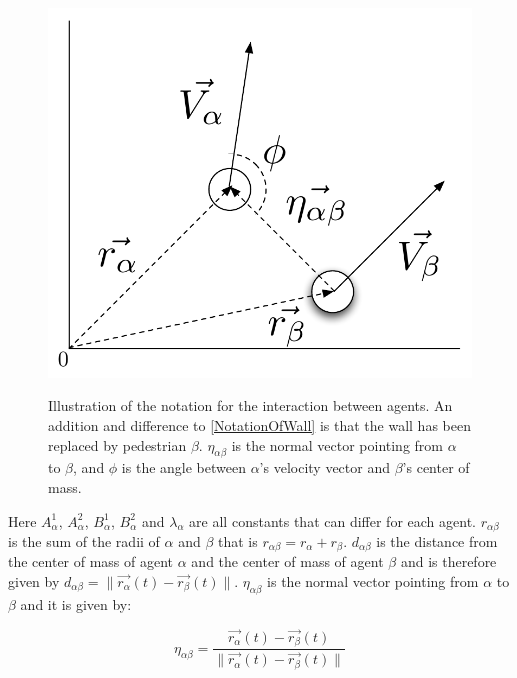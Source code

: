 \begin{figure}[ht]
    \centering
    {\includegraphics[scale=0.35]{Figures/NotationOfInteraction.pdf}} 
    \caption[Notation of the interaction between two agents]{Illustration of the notation for the interaction between agents.
	     An addition and difference to \ref{NotationOfWall} is that the wall has been replaced by pedestrian $\beta$.
	     $\eta_{\alpha \beta}$ is the normal vector pointing from $\alpha$ to $\beta$, and $\phi$ is the angle between $\alpha$'s 
	     velocity vector and $\beta$'s center of mass.}
    \label{NotationOfInteraction}
\end{figure}

Here $A_{\alpha}^{1}$, $A_{\alpha}^{2}$, $B_{\alpha}^{1}$, $B_{\alpha}^{2}$ 
and $\lambda_{\alpha}$ are all constants that can differ for each agent. 
$r_{\alpha \beta}$ is the sum of the radii of $\alpha$ and $\beta$ that is 
$r_{\alpha \beta} = r_{\alpha} + r_{\beta}$. $d_{\alpha \beta}$ is the 
distance from the center of mass of agent $\alpha$ and the center of mass of 
agent $\beta$ and is therefore given by $d_{\alpha \beta} = 
\|\vec{r_{\alpha}}\left( t \right) - \vec{r_{\beta}}\left( t \right) \|$.
$\eta_{\alpha \beta}$ is the normal vector pointing from $\alpha$ to $\beta$ 
and it is given by:

\begin{equation}
    \eta_{\alpha \beta} =
        \frac{\vec{r_{\alpha}}(t) - \vec{r_{\beta}}(t)}
             {\|\vec{r_{\alpha}}(t) - \vec{r_{\beta}}(t) \|}
\end{equation}

